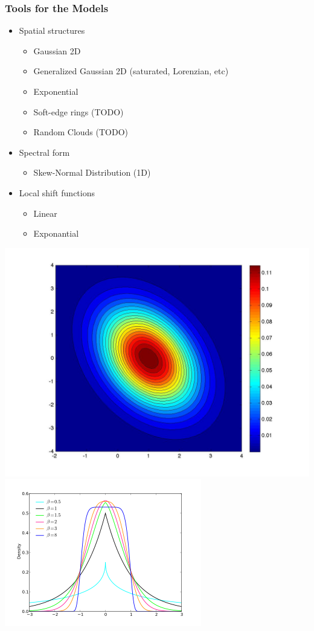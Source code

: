 \documentclass[slidestop,compress,mathserif,color,12pt]{beamer}
\begin{document}
\begin{frame}
  \frametitle{Tools for the Models}
\scriptsize
\begin{minipage}{0.63\linewidth} 
\begin{itemize}
\item Spatial structures
   \begin{itemize}
      \item \scriptsize Gaussian 2D
      \item Generalized Gaussian 2D (saturated, Lorenzian, etc)
      \item Exponential
      \item Soft-edge rings (TODO)
      \item Random Clouds (TODO)
   \end{itemize}
\item Spectral form
   \begin{itemize}
     \item \scriptsize Skew-Normal Distribution (1D)
   \end{itemize}
\item Local shift functions
   \begin{itemize}
     \item \scriptsize Linear
     \item Exponantial
   \end{itemize}
\end{itemize}
\end{minipage}
\begin{minipage}{0.33\linewidth}
\includegraphics[width=0.8\linewidth]{gauss.jpg}\\
\includegraphics[width=0.49\linewidth]{gg.png}

\end{minipage}
\end{frame}
\end{document}

